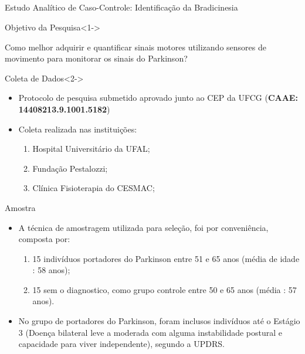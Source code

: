 \documentclass{beamer}
\begin{document}
\subsection{}
\begin{frame}{Estudo Analítico de Caso-Controle: Identificação da Bradicinesia} 
    \begin{block}{Objetivo da Pesquisa}<1->

    
    Como melhor adquirir e quantificar sinais motores utilizando sensores de movimento para monitorar os sinais do Parkinson?

    \end{block}
		\begin{block}{Coleta de Dados}<2->
			\begin{itemize}
				\item Protocolo de pesquisa submetido aprovado junto ao CEP da UFCG (\textbf{CAAE: 14408213.9.1001.5182})
				\item Coleta realizada nas instituições:
					\begin{enumerate}
						\item Hospital Universitário da UFAL;
						\item Fundação Pestalozzi;
						\item Clínica Fisioterapia do CESMAC;
				\end{enumerate}				
			\end{itemize}
    \end{block}
\end{frame}

\begin{frame}{Amostra} 
    \begin{block}{}
			\begin{itemize}[<+->]
				\item A técnica de amostragem utilizada para seleção, foi por conveniência, composta por:
				\begin{enumerate}
					\item 15 indivíduos portadores do Parkinson entre 51 e 65 anos (média de idade : 58 anos);
					\item 15 sem o diagnostico, como grupo controle entre 50 e 65 anos (média : 57 anos).
				\end{enumerate}
					\item No grupo de portadores do Parkinson, foram inclusos indivíduos até o Estágio 3 (Doença bilateral leve a moderada com alguma instabilidade postural e capacidade para viver independente), segundo a UPDRS.
				\end{itemize}
    \end{block}
\end{frame}
 
\end{document}
